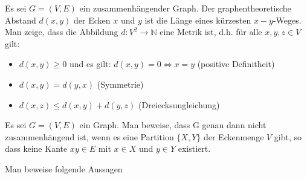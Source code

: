 \documentclass[10pt, a4paper]{exam}
\begin{document}
\begin{questions}
    \question Es sei $G=(V,E)$ ein zusammenhängender Graph. Der graphentheoretische Abstand $d(x, y)$ der Ecken $x$ und $y$ ist die Länge eines kürzesten $x-y$-Weges. Man zeige, dass die Abbildung $d:V^2\rightarrow\mathbb{N}$ eine Metrik ist, d.h. für alle $x, y, z\in V$ gilt:
    \begin{itemize}
        \item $d(x,y)\geq 0$ und es gilt: $d(x,y)=0\Leftrightarrow x = y$ (positive Definitheit)
        \item $d(x,y) = d(y,x)$ (Symmetrie)
        \item $d(x,z)\leq d(x, y) + d(y,z)$ (Dreiecksungleichung)
    \end{itemize}
    \begin{solution}
    \end{solution}

    \question Es sei $G=(V,E)$ ein Graph. Man beweise, dass G genau dann nicht zusammenhängend ist, wenn es eine Partition $\{X,Y\}$ der Eckenmenge $V$ gibt, so dass keine Kante $xy\in E$ mit $x\in X$ und $y\in Y$ existiert.
    \begin{solution}
    \end{solution}

    \question Man beweise folgende Aussagen


\end{questions}
\end{document}
